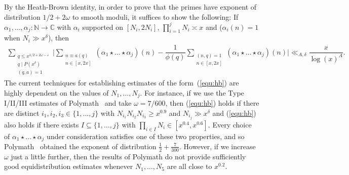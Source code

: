 \documentclass{amsart}
\numberwithin{equation}{section}
\begin{document}
\vspace{3mm}
 By the Heath-Brown identity, in order to prove that the primes have exponent of distribution $1/2+2\omega$ to smooth moduli, it suffices to show the following: If $\alpha_1, \dots, \alpha_j : \mathbb{N} \rightarrow \mathbb{C}$  with $\alpha_i$ supported on $[N_i,2N_i]$,  $\prod_{i=1}^j N_i \asymp x$ and ($\alpha_i(n)=1$ when $N_i \gg x^\delta$), then 
\begin{align} \label{equ:hb}
\sum_{\substack{ q \leq x^{1/2+2\omega -\varepsilon} \\ q \mid P(x^\delta) \\ (q,a)=1
 }} \Bigg| \sum_{ \substack{ n \equiv a (q) \\ n \in [x,2x]}} (\alpha_1 \star \dots \star \alpha_j)(n) -\dfrac{1}{\phi(q) } \sum_{\substack{ (n,q)=1\\ n \in [x,2x]}}  (\alpha_1 \star \dots \star \alpha_j)(n)  \Bigg|  \ll_{A,\delta} \dfrac{x}{\log(x)^A}.
\end{align}
The current techniques for establishing estimates of the form~(\ref{equ:hb}) are highly dependent on the values of $N_1, \dots, N_j$. For instance, if we use the Type I/II/III estimates of Polymath~\cite{Polymath:2014:EDZ} and take $\omega = 7/600$, then (\ref{equ:hb}) holds if there are distinct $i_1, i_2, i_3 \in \{1,\dots,j\}$ with $N_{i_1}N_{i_2}N_{i_3} \geq x^{0.9}$ and $N_{i_j} \gg x^\delta$ and (\ref{equ:hb}) also holds if there exists $I \subseteq \{1, \dots, j\}$ with $\prod_{i \in I} N_i \in [x^{0.4},x^{0.6}]$. Every choice of $\alpha_1 \star \dots \star \alpha_j$ under consideration satisfies one of these two properties, and so  Polymath~\cite{Polymath:2014:EDZ} obtained the exponent of distribution $\frac{1}{2}+\frac{7}{300}$. However,  if we increase $\omega$ just a little further, then the results of Polymath do not provide sufficiently good equidistribution  estimates whenever $N_1, \dots, N_5$ are all close to $x^{0.2}$.
\end{document}
